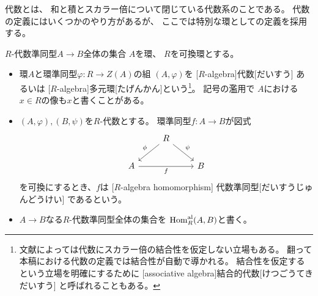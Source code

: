 \documentclass[report]{jlreq}
\begin{document}
代数とは、
和と積とスカラー倍について閉じている代数系のことである。
代数の定義にはいくつかのやり方があるが、
ここでは特別な環としての定義を採用する。

\begin{definition}[代数]
        {$R$-代数準同型$A \to B$全体の集合}
    $A$を環、
    $R$を可換環とする。
    \begin{itemize}
        \item 環$A$と環準同型$\varphi \colon R \to Z(A)$の組
            $(A, \varphi)$を
            [$R$-algebra]{代数}[だいすう]
            あるいは
            [$R$-algebra]{多元環}[たげんかん]という\footnote{
                文献によっては代数にスカラー倍の結合性を仮定しない立場もある。
                翻って本稿における代数の定義では結合性が自動で導かれる。
                結合性を仮定するという立場を明確にするために
                [associative algebra]{結合的代数}[けつごうてきだいすう]
                と呼ばれることもある。
            }。
            記号の濫用で
            $A$における$x \in R$の像も$x$と書くことがある。
        \item $(A, \varphi), (B, \psi)$を$R$-代数とする。
            環準同型$f \colon A \to B$が図式
            \begin{equation}
                \begin{tikzcd}
                    & R \ar{ld}[swap]{\phi} \ar{rd}{\psi} \\
                    A \ar{rr}[swap]{f} && B
                \end{tikzcd}
            \end{equation}
            を可換にするとき、$f$は
            [$R$-algebra homomorphism]
            {代数準同型}[だいすうじゅんどうけい]
            であるという。
        \item $A \to B$なる$R$-代数準同型全体の集合を
            $\operatorname{Hom}_R^{\mathrm{al}} (A, B)$と書く。
    \end{itemize}
\end{definition}
\end{document}
